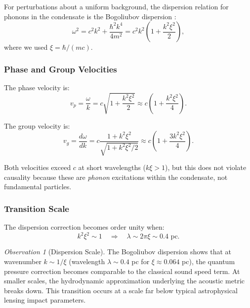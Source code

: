 \documentclass[11pt,a4paper]{article}
\theoremstyle{definition}
\theoremstyle{remark}
\newtheorem{observation}{Observation}[section]
\begin{document}
For perturbations about a uniform background, the dispersion relation for phonons in the condensate is the Bogoliubov dispersion \cite{Bogoliubov1947}:
\begin{equation}
\label{eq:bogoliubov}
\omega^2 = c^2 k^2 + \frac{\hbar^2 k^4}{4m^2} = c^2 k^2 \left(1 + \frac{k^2 \xi^2}{2}\right),
\end{equation}
where we used $\xi = \hbar/(mc)$.

\subsubsection{Phase and Group Velocities}

The phase velocity is:
\begin{equation}
v_p = \frac{\omega}{k} = c \sqrt{1 + \frac{k^2\xi^2}{2}} \approx c\left(1 + \frac{k^2\xi^2}{4}\right).
\end{equation}

The group velocity is:
\begin{equation}
v_g = \frac{d\omega}{dk} = c \frac{1 + k^2\xi^2}{\sqrt{1 + k^2\xi^2/2}} \approx c\left(1 + \frac{3k^2\xi^2}{4}\right).
\end{equation}

Both velocities exceed $c$ at short wavelengths ($k\xi > 1$), but this does not violate causality because these are \emph{phonon} excitations within the condensate, not fundamental particles.

\subsubsection{Transition Scale}

The dispersion correction becomes order unity when:
\begin{equation}
k^2 \xi^2 \sim 1 \quad \Rightarrow \quad \lambda \sim 2\pi\xi \sim 0.4 \text{ pc}.
\end{equation}

\begin{observation}[Dispersion Scale]
The Bogoliubov dispersion shows that at wavenumber $k \sim 1/\xi$ (wavelength $\lambda \sim 0.4$ pc for $\xi \approx 0.064$ pc), the quantum pressure correction becomes comparable to the classical sound speed term. At smaller scales, the hydrodynamic approximation underlying the acoustic metric breaks down. This transition occurs at a scale far below typical astrophysical lensing impact parameters.
\end{observation}
\end{document}
